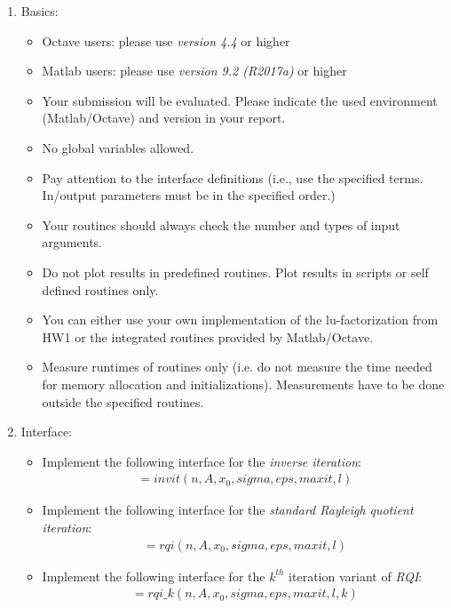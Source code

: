 \documentclass{scrartcl}
\begin{document}
\begin{enumerate}
	\item Basics:
	\begin{itemize}
		\item Octave users: please use \textit{version 4.4} or higher
		\item Matlab users: please use \textit{version 9.2 (R2017a)} or higher 
		\item Your submission will be evaluated. Please indicate the used environment (Matlab/Octave) and version in your report.
		\item No global variables allowed.
		\item Pay attention to the interface definitions (i.e., use the specified terms. In/output parameters must be in the specified order.)
		\item Your routines should always check the number and types of input arguments.
		\item Do not plot results in predefined routines. Plot results in scripts or self defined routines only.
		\item You can either use your own implementation of the lu-factorization from HW1 or the integrated routines provided by Matlab/Octave.
		\item Measure runtimes of routines only (i.e. do not measure the time needed for memory allocation and initializations). Measurements
have to be done outside the specified routines.
	\end{itemize}

	\item Interface:
	\begin{itemize}
		\item Implement the following interface for the \textit{inverse iteration}:
		\begin{eqnarray*}
			[lambda, v, it, erreval, errres] = invit(n, A, x_0, sigma, eps, maxit, l)
		\end{eqnarray*}
		\item Implement the following interface for the \textit{standard Rayleigh quotient iteration}:
		\begin{eqnarray*}
			[lambda, v, it, erreval, errres] = rqi(n, A, x_0, sigma, eps, maxit, l)				
		\end{eqnarray*}

\item Implement the following interface for the $k^{th}$ iteration variant of \textit{RQI}:
		\begin{eqnarray*}
			[lambda, v, it, erreval, errres] = rqi\_k(n, A, x_0, sigma, eps, maxit, l, k)			
		\end{eqnarray*}	
	

\end{itemize}
\end{enumerate}
\end{document}
